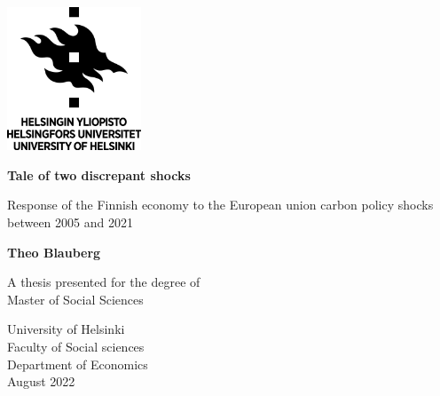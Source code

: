 \begin{titlepage}
    \begin{center}
        \vspace*{1cm}
        
        \includegraphics[width=0.3\textwidth]{latex/university.png}
        
        \vspace{1.5cm}
        
        \textbf{Tale of two discrepant shocks}
 
        \vspace{0.5cm}
         Response of the Finnish economy to the European union carbon policy shocks between 2005 and 2021 
             
        \vspace{0.5cm}
 
        \textbf{Theo Blauberg}
 
        \vfill
             
        A thesis presented for the degree of\\
        Master of Social Sciences
             
        \vspace{0.8cm}

    

    
        University of Helsinki\\
        Faculty of Social sciences\\
        Department of Economics\\
        August 2022

    \end{center}         
    
\end{titlepage}